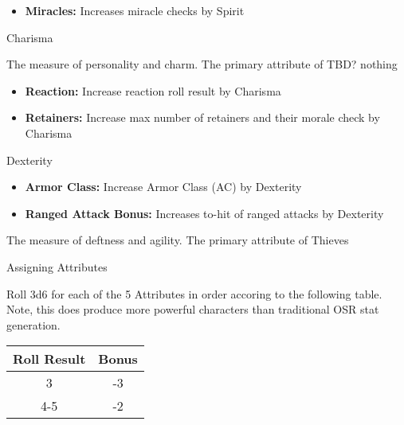 \documentclass[18pt]{article}
\begin{document}
\begin{multicols}{2}
\begin{itemize}
\setlength\itemsep{0em}
	\item \textbf{Miracles:} Increases miracle checks by Spirit
\end{itemize}

\begin{mercHeading}
Charisma
\end{mercHeading}
The measure of personality and charm. The primary attribute of TBD? nothing

\begin{itemize}
\setlength\itemsep{0em}
	\item \textbf{Reaction:} Increase reaction roll result by Charisma
	\item \textbf{Retainers:} Increase max number of retainers and their morale check by Charisma
\end{itemize}

\begin{mercHeading}
Dexterity
\end{mercHeading}

\begin{itemize}
\setlength\itemsep{0em}
	\item \textbf{Armor Class:} Increase Armor Class (AC) by Dexterity
	\item \textbf{Ranged Attack Bonus:} Increases to-hit of ranged attacks by Dexterity
\end{itemize}
The measure of deftness and agility. The primary attribute of Thieves

\begin{mercHeading}
Assigning Attributes
\end{mercHeading}

Roll 3d6 for each of the 5 Attributes in order accoring to the following table. Note, this does produce more powerful characters than traditional OSR stat generation.


\begin{table}[H]

\begin{center}
\Large
{}
\begin{tabular}{ c  c  }


\textbf{
Roll Result} &\textbf{ Bonus}\\
\bottomrule
\bottomrule

3 & -3 \\

4-5 & -2 \\


\end{tabular}
\end{center}
\end{table}
\end{multicols}
\end{document}
